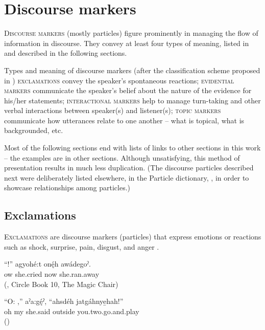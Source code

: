 \chapter{Discourse markers} \label{ch:Discourse markers}
\textsc{Discourse markers} (mostly particles) figure prominently in managing the flow of information in discourse. They convey at least four types of meaning, listed in  and described in the following sections.

\ea\label{ex:discoursemarkerintro} Types and meaning of discourse markers (after the classification scheme proposed in \cite[26]{andersen_pragmatic_2001})
\ea \textsc{exclamations} convey the speaker’s spontaneous reactions; 
\ex \textsc{evidential markers} communicate the speaker’s belief about the nature of the evidence for his/her statements;
\ex \textsc{interactional markers} help to manage turn-taking and other verbal interactions between speaker(s) and listener(s); 
\ex \textsc{topic markers} communicate how utterances relate to one another -- what is topical, what is backgrounded, etc.
\z
\z

Most of the following sections end with lists of links to other sections in this work -- the examples are in other sections. Although unsatisfying, this method of presentation results in much less duplication. (The discourse particles described next were deliberately listed elsewhere, in the Particle dictionary, , in order to showcase relationships among particles.)


\section{Exclamations} \label{ch:Exclamations}
\textsc{Exclamations} are discourse markers (particles) that express emotions or reactions such as shock, surprise, pain, disgust, and anger . 

\ea\label{ex:exclamations1}
 \gll “!” agyohé:t onę́h awádegoˀ.\\
ow she.cried now she.ran.away\\
\glt {} (\cite{keye_circle_2016}, Circle Book 10, The Magic Chair)
\z

\ea\label{ex:exclamations2}
 \gll “O: ,” aˀa:gę́ˀ, “ahsdéh jatgáhnye̱hah!” \\
oh my she.said outside you.two.go.and.play \\
\glt {} (\cite{henry_de_2005})
\z

